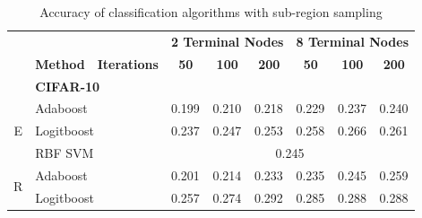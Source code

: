 \documentclass[12pt]{article}
\begin{document}
\begin{sloppypar}
\begin{table}[hbt!]
\centering
\caption{Accuracy of classification algorithms with sub-region sampling}
\label{tab:subsampling_results}
\begin{tabular}{lllllllll}
\hline
\multicolumn{3}{l}{\textbf{}}                                                     & \multicolumn{3}{c}{\textbf{2 Terminal Nodes}}                                                         & \multicolumn{3}{c}{\textbf{8 Terminal Nodes}}                                                         \\
\textbf{}                              & \textbf{Method}   & \textbf{Iterations}  & \multicolumn{1}{c}{\textbf{50}} & \multicolumn{1}{c}{\textbf{100}} & \multicolumn{1}{c}{\textbf{200}} & \multicolumn{1}{c}{\textbf{50}} & \multicolumn{1}{c}{\textbf{100}} & \multicolumn{1}{c}{\textbf{200}} \\ \hline
                                       & \multicolumn{2}{l}{\textbf{CIFAR-10}}    & \multicolumn{6}{l}{}                                                                                                                                                                                          \\
\multicolumn{1}{c}{\multirow{3}{*}{E}} & \multicolumn{2}{l}{Adaboost}             & 0.199                           & 0.210                            & 0.218                            & 0.229                           & 0.237                            & 0.240                            \\
\multicolumn{1}{c}{}                   & \multicolumn{2}{l}{Logitboost}           & 0.237                           & 0.247                            & 0.253                            & 0.258                           & 0.266                            & 0.261                            \\
\multicolumn{1}{c}{}                   & \multicolumn{2}{l}{RBF SVM}              & \multicolumn{6}{c}{0.245}                                                                                                                                                                                     \\
\multirow{3}{*}{R}                     & \multicolumn{2}{l}{Adaboost}             & 0.201                           & 0.214                            & 0.233                            & 0.235                           & 0.245                            & 0.259                            \\
                                       & \multicolumn{2}{l}{Logitboost}           & 0.257                           & 0.274                            & 0.292                            & 0.285                           & 0.288                            & 0.288                            \\

\end{tabular}
\end{table}
\end{sloppypar}
\end{document}
